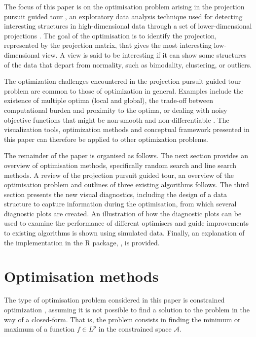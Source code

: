 The focus of this paper is on the optimisation problem arising in the
projection pursuit guided tour \citep{buja2005computational}, an
exploratory data analysis technique used for detecting interesting
structures in high-dimensional data through a set of lower-dimensional
projections \citep{cook2008grand}. The goal of the optimisation is to
identify the projection, represented by the projection matrix, that
gives the most interesting low-dimensional view. A view is said to be
interesting if it can show some structures of the data that depart from
normality, such as bimodality, clustering, or outliers.

The optimization challenges encountered in the projection pursuit guided
tour problem are common to those of optimization in general. Examples
include the existence of multiple optima (local and global), the
trade-off between computational burden and proximity to the optima, or
dealing with noisy objective functions that might be non-smooth and
non-differentiable \citep{jones1998efficient}. The visualization tools,
optimization methods and conceptual framework presented in this paper
can therefore be applied to other optimization problems.

The remainder of the paper is organised as follows. The next section
provides an overview of optimisation methods, specifically random search
and line search methods. A review of the projection pursuit guided tour,
an overview of the optimisation problem and outlines of three existing
algorithms follows. The third section presents the new visual
diagnostics, including the design of a data structure to capture
information during the optimisation, from which several diagnostic plots
are created. An illustration of how the diagnostic plots can be used to
examine the performance of different optimisers and guide improvements
to existing algorithms is shown using simulated data. Finally, an
explanation of the implementation in the R package, 
\citep{ferrn}, is provided.

\hypertarget{optim}{%
\section{Optimisation methods}\label{optim}}

The type of optimisation problem considered in this paper is constrained
optimization \citep{bertsekas2014constrained}, assuming it is not
possible to find a solution to the problem in the way of a closed-form.
That is, the problem consists in finding the minimum or maximum of a
function \(f \in L^p\) in the constrained space \(\mathcal{A}\).

